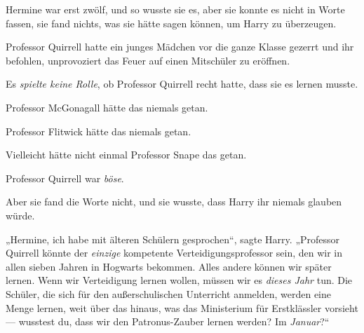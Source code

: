 Hermine war erst zwölf, und so wusste sie es, aber sie konnte es nicht in Worte fassen, sie fand nichts, was sie hätte sagen können, um Harry zu überzeugen.

Professor Quirrell hatte ein junges Mädchen vor die ganze Klasse gezerrt und ihr befohlen, unprovoziert das Feuer auf einen Mitschüler zu eröffnen.

Es \emph{spielte keine Rolle}, ob Professor Quirrell recht hatte, dass sie es lernen musste.

Professor McGonagall hätte das niemals getan.

Professor Flitwick hätte das niemals getan.

Vielleicht hätte nicht einmal Professor Snape das getan.

Professor Quirrell war \emph{böse}.

Aber sie fand die Worte nicht, und sie wusste, dass Harry ihr niemals glauben würde.

„Hermine, ich habe mit älteren Schülern gesprochen“, sagte Harry.
„Professor Quirrell könnte der \emph{einzige} kompetente Verteidigungsprofessor sein, den wir in allen sieben Jahren in Hogwarts bekommen. Alles andere können wir später lernen. Wenn wir Verteidigung lernen wollen, müssen wir es \emph{dieses Jahr} tun. Die Schüler, die sich für den außerschulischen Unterricht anmelden, werden eine Menge lernen, weit über das hinaus, was das Ministerium für Erstklässler vorsieht — wusstest du, dass wir den Patronus-Zauber lernen werden? Im \emph{Januar}?“

